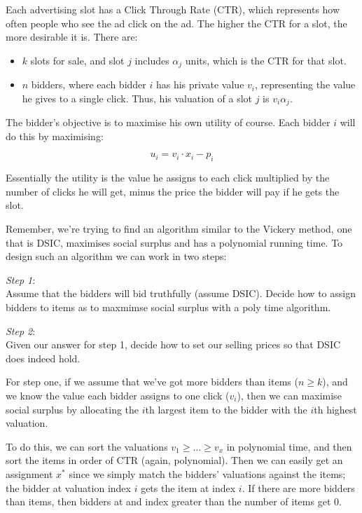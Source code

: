 Each advertising slot has a Click Through Rate (CTR), which represents how often
people who see the ad click on the ad. The higher the CTR for a slot, the more
desirable it is. There are:

\begin{itemize}
  \item $k$ slots for sale, and slot $j$ includes $\alpha_j$ units, which is the
  CTR for that slot.
  \item $n$ bidders, where each bidder $i$ has his private value $v_i$, 
  representing the value he gives to a single click. Thus, his valuation of a
  slot $j$ is $v_i\alpha_j$.
\end{itemize}

The bidder's objective is to maximise his own utility of course. Each bidder $i$
will do this by maximising:

\[
  u_i = v_i \cdot x_i - p_i
\]

Essentially the utility is the value he assigns to each click multiplied by the
number of clicks he will get, minus the price the bidder will pay if he gets the
slot.

Remember, we're trying to find an algorithm similar to the Vickery method, one
that is DSIC, maximises social surplus and has a polynomial running time. To
design such an algorithm we can work in two steps:

\begin{description}
  \item \textit{Step 1}:\\
    Assume that the bidders will bid truthfully (assume DSIC). Decide how to 
    assign bidders to items as to maxmimse social surplus with a poly time
    algorithm.
  \item \textit{Step 2}:\\
    Given our answer for step 1, decide how to set our selling prices so that
    DSIC does indeed hold.
\end{description}

For step one, if we assume that we've got more bidders than items ($n \geq k$),
and we know the value each bidder assigns to one click ($v_i$), then we can
maximise social surplus by allocating the $i$th largest item to the bidder with
the $i$th highest valuation.


To do this, we can sort the valuations $v_1 \geq \dots \geq v_x$ in polynomial
time, and then sort the items in order of CTR (again, polynomial). Then we can
easily get an assignment $x^*$ since we simply match the bidders' valuations
against the items; the bidder at valuation index $i$ gets the item at index $i$.
If there are more bidders than items, then bidders at and index greater than the
number of items get $0$.

